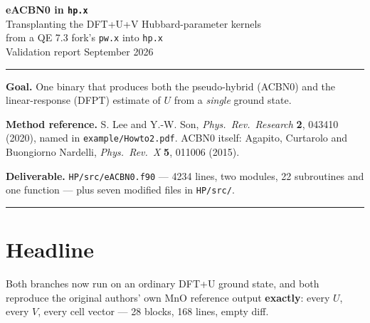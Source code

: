 \documentclass[11pt,a4paper]{article}
\newcommand{\C}[1]{\texttt{\small #1}}
\begin{document}
\begin{center}
{\LARGE\bfseries eACBN0 in \texttt{hp.x}}\\[3pt]
{\large\color{mute} Transplanting the DFT+U+V Hubbard-parameter kernels\\
from a QE 7.3 fork's \texttt{pw.x} into \texttt{hp.x}}\\[10pt]
{\small Validation report \quad\textbullet{} September 2026}
\end{center}

\vspace{4pt}
\noindent\textcolor{rule}{\rule{\textwidth}{0.8pt}}
\vspace{6pt}

\noindent
\textbf{Goal.} One binary that produces both the pseudo-hybrid (ACBN0) and the
linear-response (DFPT) estimate of $U$ from a \emph{single} ground state.

\smallskip
\noindent
\textbf{Method reference.} S. Lee and Y.-W. Son, \emph{Phys.\ Rev.\ Research}
\textbf{2}, 043410 (2020), named in \C{example/Howto2.pdf}. ACBN0 itself:
Agapito, Curtarolo and Buongiorno Nardelli, \emph{Phys.\ Rev.\ X} \textbf{5},
011006 (2015).

\smallskip
\noindent
\textbf{Deliverable.} \C{HP/src/eACBN0.f90} --- 4234 lines, two modules,
22 subroutines and one function --- plus seven modified files in \C{HP/src/}.

\vspace{2pt}
\noindent\textcolor{rule}{\rule{\textwidth}{0.8pt}}

\section{Headline}

Both branches now run on an ordinary DFT+U ground state, and both reproduce the
original authors' own MnO reference output \textbf{exactly}: every $U$, every
$V$, every cell vector --- 28 blocks, 168 lines, empty diff.
\end{document}
